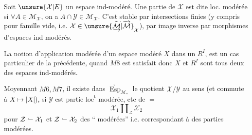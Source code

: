 Soit $\unsure{\mathcal X|E}$ un espace ind-modéré. Une partie  de $\mathcal X$ est dite loc. modérée si $\forall A\in\mathcal M_{\mathcal X}$, on a $A\cap\mathcal Y\in\mathcal M_{\mathcal X}$. C'est stable par intersections finies (y compris pour famille vide, i.e. $\mathcal X\in\unsure{\underrightarrow{\widetilde{\mathcal M}}|\overrightarrow{\mathcal M}}_{\mathcal X}$), par image inverse par morphismes  d'espaces ind-modérés.

La notion d'application modérée d'un espace modéré $X$ dans un $R^I$, est un cas particulier de la précédente, quand $M8$ est satisfait donc $X$ et $R^I$ sont tous deux des espaces ind-modérés.

Moyennant $M6,M7$, il existe  dans $\underrightarrow{\operatorname{Esp}}_{\mathcal M_*}$ le quotient $\mathcal X/\mathcal Y$ au sens (et commute à $X\mapsto|X|$), si $\mathcal Y$ est partie $\mathrm{loc}^{\mathrm t}$ modérée, etc de $=$
\[
 \mathcal X_1\amalg_{\mathcal Z}\mathcal X_2
\]
pour $\mathcal Z\lhook\joinrel\relbar\mathcal X_1$ et $\mathcal Z\lhook\joinrel\relbar\mathcal X_2$ des `` modérées'' i.e. correspondant à des parties  modérées.
